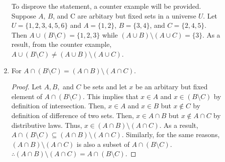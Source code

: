 \documentclass{article}
\begin{document}
\begin{enumerate}
\begin{flushleft}
\begin{enumerate}
\begin{enumerate}
					To disprove the statement, a counter example will be provided. Suppose $A$, $B$, and C are arbitary but fixed sets in a universe $U$. Let $U = \{1, 2, 3, 4, 5, 6\}$ and $A = \{1, 2\}$, $B = \{3, 4\}$, and $C = \{2, 4, 5\}$. Then $A \cup (B \setminus C) = \{1, 2, 3\}$  while $ (A \cup B) \setminus (A \cup C) = \{3\}$. As a result, from the counter example, $A \cup (B \setminus C) \neq (A \cup B) \setminus (A \cup C)$.
					\\ \vspace{2mm} 
					\item For $A \cap (B \setminus C) = (A \cap B) \setminus (A \cap C)$.
						\begin{proof}
							Let $A, B,$ and $C$ be sets and let $x$ be an arbitary but fixed element of $A \cap (B \setminus C)$. This implies that $x \in A$ and $x \in (B \setminus C)$ by definition of intersection. Then, $x \in A$ and $x \in B$ but $x \notin C$ by definition of difference of two sets. Then, $x \in A \cap B$ but $x \notin A \cap C$ by distributive laws. Thus, $x \in (A \cap B) \setminus (A \cap C)$. As a result, $A \cap (B \setminus C) \subseteq (A \cap B) \setminus (A \cap C)$. Similarly, for the same reasons, $(A \cap B) \setminus (A \cap C)$ is also a subset of $A \cap (B \setminus C)$.  $\therefore (A \cap B) \setminus (A \cap C) = A \cap (B \setminus C)$.
						\end{proof}
				\end{enumerate}
				

\end{enumerate}
\end{flushleft}
\end{enumerate}
\end{document}
